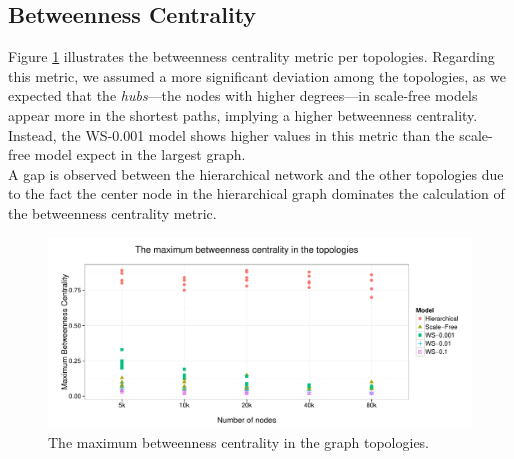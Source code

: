 \subsection{Betweenness Centrality}

Figure \ref{fig:betweenness_metric} illustrates the betweenness centrality metric per topologies. Regarding this metric, we assumed a more significant deviation among the topologies, as we expected that the \emph{hubs}---the nodes with higher degrees---in scale-free models appear more in the shortest paths, implying a higher betweenness centrality. Instead, the WS-0.001 model shows higher values in this metric than the scale-free model expect in the largest graph.\\
A gap is observed between the hierarchical network and the other topologies due to the fact the center node in the hierarchical graph dominates the calculation of the betweenness centrality metric.

\begin{figure}[!ht]
	\centering
	\includegraphics[width=160mm, keepaspectratio]{figures/betweenness_metric.pdf}
	\caption{The maximum betweenness centrality in the graph topologies.}
	\label{fig:betweenness_metric}
\end{figure}




